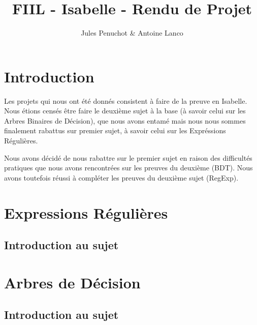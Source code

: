 \documentclass{article}
\title{FIIL - Isabelle - Rendu de Projet}
\author{Jules Penuchot \& Antoine Lanco}
\begin{document}
\maketitle

\section{Introduction}

Les projets qui nous ont été donnés consistent à faire de la preuve en Isabelle. Nous étions censés être faire le deuxième sujet à la base (à savoir celui sur les Arbres Binaires de Décision), que nous avons entamé mais nous nous sommes finalement rabattus sur premier sujet, à savoir celui sur les Expréssions Régulières.

Nous avons décidé de nous rabattre sur le premier sujet en raison des difficultés pratiques que nous avons rencontrées sur les preuves du deuxième (BDT). Nous avons toutefois réussi à compléter les preuves du deuxième sujet (RegExp).

\section{Expressions Régulières}

\subsection{Introduction au sujet}



\section{Arbres de Décision}

\subsection{Introduction au sujet}
\end{document}
